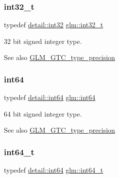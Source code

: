 \subsubsection{\texorpdfstring{int32\+\_\+t}{int32\_t}}
{\footnotesize\ttfamily typedef \mbox{\hyperlink{namespaceglm_1_1detail_a9f85b4efeca416cdcec2fd08939a2e17}{detail\+::int32}} \mbox{\hyperlink{group__gtc__type__precision_gab870c0eb6f525b0c8c4716762e0fc3a8}{glm\+::int32\+\_\+t}}}

32 bit signed integer type. \begin{DoxySeeAlso}{See also}
\mbox{\hyperlink{group__gtc__type__precision}{G\+L\+M\+\_\+\+G\+T\+C\+\_\+type\+\_\+precision}} 
\end{DoxySeeAlso}
\mbox{\label{group__gtc__type__precision_ga435d75819cce297cc5fa21bd84ef89a5}} 
\subsubsection{\texorpdfstring{int64}{int64}}
{\footnotesize\ttfamily typedef \mbox{\hyperlink{namespaceglm_1_1detail_a5b1c3227ec636c24a0676746381adfc8}{detail\+::int64}} \mbox{\hyperlink{group__gtc__type__precision_ga435d75819cce297cc5fa21bd84ef89a5}{glm\+::int64}}}

64 bit signed integer type. \begin{DoxySeeAlso}{See also}
\mbox{\hyperlink{group__gtc__type__precision}{G\+L\+M\+\_\+\+G\+T\+C\+\_\+type\+\_\+precision}} 
\end{DoxySeeAlso}
\mbox{\label{group__gtc__type__precision_ga6abb23fbf4e39c50ec5341160b5da5ab}} 
\subsubsection{\texorpdfstring{int64\+\_\+t}{int64\_t}}
{\footnotesize\ttfamily typedef \mbox{\hyperlink{namespaceglm_1_1detail_a5b1c3227ec636c24a0676746381adfc8}{detail\+::int64}} \mbox{\hyperlink{group__gtc__type__precision_ga6abb23fbf4e39c50ec5341160b5da5ab}{glm\+::int64\+\_\+t}}}

